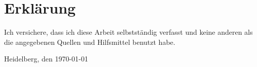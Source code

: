 \chapter*{Erkl\"{a}rung}

Ich versichere, dass ich diese Arbeit selbstst\"{a}ndig verfasst und keine 
anderen als die angegebenen Quellen und Hilfsmittel benutzt habe.

Heidelberg, den \today

